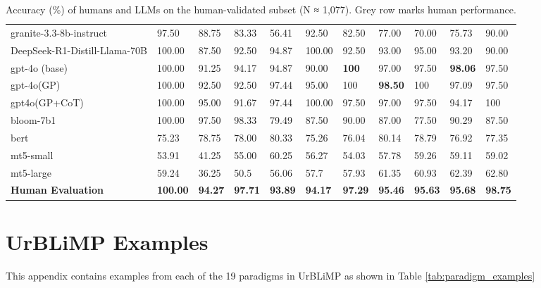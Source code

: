 \documentclass[11pt]{article}
\begin{document}
\begin{table}[h!]
\begin{tabular}{lllllllllll}
granite-3.3-8b-instruct & 97.50 & 88.75 & 83.33 & 56.41 & 92.50 & 82.50 & 77.00 & 70.00 & 75.73 & 90.00 \\
DeepSeek-R1-Distill-Llama-70B & 100.00 & 87.50 & 92.50 & 94.87 & 100.00 & 92.50 & 93.00 & 95.00 & 93.20 & 90.00 \\
gpt-4o (base) & 100.00 & 91.25 & 94.17 & 94.87 & 90.00 & \textbf{100} & 97.00 & 97.50 & \textbf{98.06} & 97.50 \\
gpt-4o(GP) & 100.00 & 92.50 & 92.50 & 97.44 & 95.00 & 100 & \textbf{98.50} & 100 & 97.09 & 97.50 \\
gpt4o(GP+CoT) & 100.00 & 95.00 & 91.67 & 97.44 & 100.00 & 97.50 & 97.00 & 97.50 & 94.17 & 100 \\
bloom-7b1 & 100.00 & 97.50 & 98.33 & 79.49 & 87.50 & 90.00 & 87.00 & 77.50 & 90.29 & 87.50 \\
bert & 75.23 & 78.75 & 78.00 & 80.33 & 75.26 & 76.04 & 80.14 & 78.79 & 76.92 & 77.35 \\
mt5-small & 53.91 & 41.25 & 55.00 & 60.25 & 56.27 & 54.03 & 57.78 & 59.26 & 59.11 & 59.02 \\
mt5-large & 59.24 & 36.25 & 50.5 & 56.06 & 57.7 & 57.93 & 61.35 & 60.93 & 62.39 & 62.80 \\
\rowcolor[HTML]{D9D9D9}
\textbf{Human Evaluation} & \textbf{100.00} & \textbf{94.27} & \textbf{97.71} & \textbf{93.89} & \textbf{94.17} & \textbf{97.29} & \textbf{95.46} & \textbf{95.63} & \textbf{95.68} & \textbf{98.75}\\
\hline
\end{tabular}
\caption{Accuracy (\%) of humans and LLMs on the human-validated subset (N ≈ 1,077).  
Grey row marks human performance.}
\label{tab:human_llm_subset_appendix}
\end{table}




\section{UrBLiMP Examples}
\label{sec:appendix}
This appendix contains examples from each of the 19 paradigms in UrBLiMP as shown in Table \ref{tab:paradigm_examples}
\newline
\end{document}
